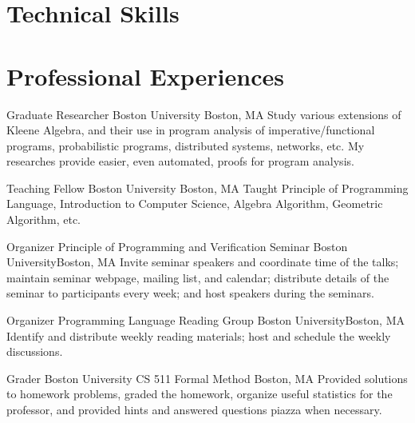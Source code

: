 \documentclass[11pt,roman]{moderncv}        %
\begin{document}
\section{Technical Skills}

\iftechnical
{}
\else
{}
\fi


\section{Professional Experiences}

{Graduate Researcher}
{Boston University}
{Boston, MA}{}
{Study various extensions of Kleene Algebra, and their use in program analysis
of imperative/functional programs, probabilistic programs, distributed systems, networks, etc.
My researches provide easier, even automated, proofs for program analysis.
}

{Teaching Fellow}
{Boston University}
{Boston, MA}{}
{
  Taught Principle of Programming Language, Introduction to Computer Science,
  Algebra Algorithm, Geometric Algorithm, etc.
}


{Organizer}
{Principle of Programming and Verification Seminar}
{Boston University}{Boston, MA}
{Invite seminar speakers and coordinate time of the talks;
maintain seminar webpage, mailing list, and calendar;
distribute details of the seminar to participants every week;
and host speakers during the seminars.}

{Organizer}
{Programming Language Reading Group}
{Boston University}{Boston, MA}
{Identify and distribute weekly reading materials;
host and schedule the weekly discussions.}

{Grader}
{Boston University CS 511 Formal Method}
{Boston, MA}{}
{Provided solutions to homework problems, graded the homework,
organize useful statistics for the professor, 
and provided hints and answered questions piazza when necessary.}
\end{document}
